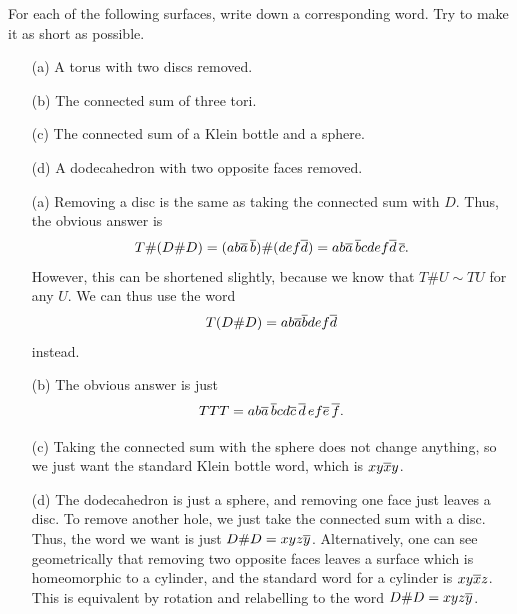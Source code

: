 \documentclass[a4paper]{amsart}
\begin{document}
\begin{exercise}
 For each of the following surfaces, write down a corresponding word.
 Try to make it as short as possible.
 \begin{itemize}
  \item[(a)] A torus with two discs removed.
  \item[(b)] The connected sum of three tori.
  \item[(c)] The connected sum of a Klein bottle and a sphere.
  \item[(d)] A dodecahedron with two opposite faces removed.
 \end{itemize}
\end{exercise}
\begin{solution}
 \begin{itemize}
  \item[(a)] Removing a disc is the same as taking the connected sum
   with $D$.  Thus, the obvious answer is 
   \[ T\#(D\#D) = (ab\overline{a}\,\overline{b})\#(def\overline{d}) = ab\overline{a}\,\overline{b} cdef\overline{d}\,\overline{c}. \]
   However, this can be shortened slightly, because we know that
   $T\#U\sim TU$ for any $U$.  We can thus use the word
   \[ T(D\#D)  = ab\overline{a}\overline{b} def\overline{d} \]
   instead.
  \item[(b)] The obvious answer is just 
   \[ TTT = ab\overline{a}\,\overline{b} cd\overline{c}\,\overline{d}\, ef\overline{e}\,\overline{f}. \]
  \item[(c)] Taking the connected sum with the sphere does not change
   anything, so we just want the standard Klein bottle word, which is
   $xy\overline{x} y$.
  \item[(d)] The dodecahedron is just a sphere, and removing one face
   just leaves a disc.  To remove another hole, we just take the
   connected sum with a disc.  Thus, the word we want is just
   $D\# D=xyz\overline{y}$.  Alternatively, one can see geometrically that
   removing two opposite faces leaves a surface which is homeomorphic
   to a cylinder, and the standard word for a cylinder is $xy\overline{x} z$.
   This is equivalent by rotation and relabelling to the word
   $D\# D=xyz\overline{y}$. 
 \end{itemize}
\end{solution}
\end{document}
